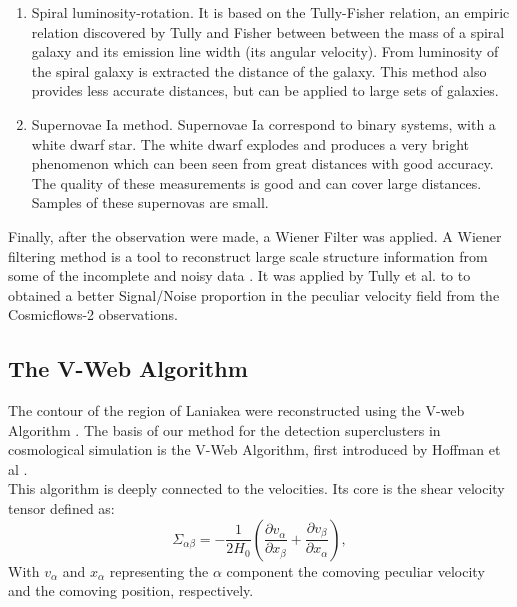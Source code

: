\documentclass[12pt]{article}
\begin{document}
\begin{par}
\begin{enumerate}
   \item Spiral luminosity-rotation. It is based on
    the Tully-Fisher relation, an empiric relation
     discovered by Tully and
      Fisher \cite{tully_fisher_1977} between between
       the mass of a spiral galaxy and its emission
        line width (its angular velocity). From
         luminosity of the spiral galaxy is extracted
          the distance of the galaxy. This method also
    provides less accurate
  distances, but can be applied to large sets of
   galaxies.\\
   
  \item Supernovae Ia method. Supernovae Ia correspond
   to binary systems, with a white dwarf star. The
    white dwarf explodes and produces a very bright
     phenomenon which can been seen from
 great distances with good accuracy. The quality of
  these measurements is good and can cover large
   distances. Samples of these supernovas
   are small.
   
\end{enumerate}     

\end{par}


\begin{par}
Finally, after the observation were made, a Wiener Filter was applied. A Wiener filtering method is a tool to reconstruct
 large scale structure information from some of the incomplete
  and noisy data \cite{zaroubi_wiener_1995}. It  was
   applied by Tully et al. \cite{tully_laniakea_2014}
    to  to obtained a better Signal/Noise proportion in
     the peculiar velocity field from the Cosmicflows-2 observations.\\
\end{par}


\subsection{The V-Web Algorithm}
\label{sec:v_web}
The contour of the region of Laniakea were reconstructed
 using the V-web Algorithm \cite{tully_laniakea_2014}.
  The basis of our method for the
  detection superclusters in cosmological simulation is
   the V-Web Algorithm, first introduced by Hoffman et al \cite{hoffman_kinematic_2012}.\\

This algorithm is deeply
  connected to the velocities. Its core is the
   shear velocity tensor  defined as:\\
$$
\Sigma _{\alpha\beta} = -\frac{1}{2 H_0} \left( \frac{\partial v_{\alpha}}{\partial x_{\beta}} + \frac{\partial v_{\beta}}{\partial x_{\alpha}} \right) ,
$$
With $v_{\alpha}$ and $x_{\alpha}$ representing the $\alpha$ component the comoving peculiar velocity and the comoving position, respectively.  \\
\end{document}
